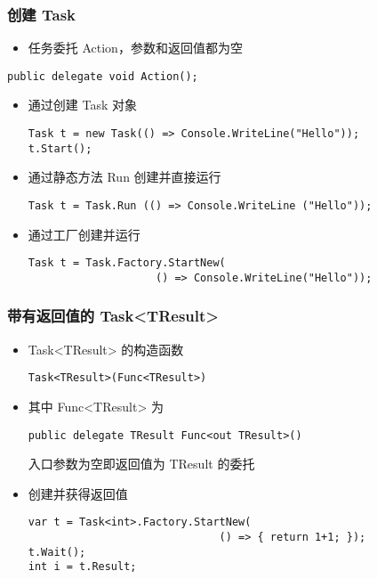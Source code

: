 \begin{frame}[fragile]
\frametitle{创建 Task}
\begin{itemize}
\item 任务委托 Action，参数和返回值都为空
\end{itemize}
\begin{lstlisting}
public delegate void Action();
\end{lstlisting}
\begin{itemize}
\item 通过创建 Task 对象
\begin{lstlisting}
Task t = new Task(() => Console.WriteLine("Hello"));
t.Start();
\end{lstlisting}
\item 通过静态方法 Run 创建并直接运行
\begin{lstlisting}
Task t = Task.Run (() => Console.WriteLine ("Hello"));
\end{lstlisting}
\item 通过工厂创建并运行
\begin{lstlisting}
Task t = Task.Factory.StartNew(
                    () => Console.WriteLine("Hello"));

\end{lstlisting}
\end{itemize}
\end{frame}


\begin{frame}[fragile]
\frametitle{带有返回值的 Task<TResult>}
\begin{itemize}
\item Task<TResult> 的构造函数
\begin{lstlisting}
Task<TResult>(Func<TResult>)
\end{lstlisting}
\item 其中 Func<TResult> 为
\begin{lstlisting}
public delegate TResult Func<out TResult>()
\end{lstlisting}
入口参数为空即返回值为 TResult 的委托
\item 创建并获得返回值
\begin{lstlisting}
var t = Task<int>.Factory.StartNew(
                              () => { return 1+1; });
t.Wait();
int i = t.Result;
\end{lstlisting}
\end{itemize}

\end{frame}


